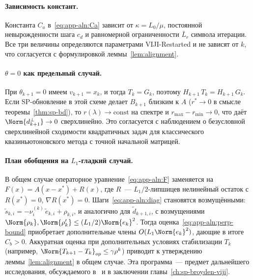 \paragraph{Зависимость констант.} Константа $C_a$ в~\eqref{eq:app-aln:Ca}
зависит от $\kappa = L_0/\mu$, постоянной невырожденности шага $c_d$
и равномерной ограниченности $\bar L_r$ символа итерации. Все три
величины определяются параметрами VIJI-Restarted и не зависят от
$k$, что согласуется с формулировкой леммы~\ref{lem:alignment}.

\paragraph{$\theta = 0$ как предельный случай.}
При $\theta_{k+1} = 0$ имеем $v_{k+1} = x_k$, и тогда
$T_k = G_k$, поэтому $H_{k+1}\,T_k = H_{k+1}\,G_k$. Если SP-обновление в
этой схеме делает $B_{k+1}$ близким к $A$ ($r^{*} \to 0$ в смысле
теоремы~\ref{thm:sp-bd}), то $r(\lambda) \to \mathrm{const}$ на спектре
и $r_{\max} - r_{\min} \to 0$, что даёт $\Norm{d_{k+1}^{\perp}} \to 0$
сверхлинейно. Это согласуется с наблюдением о
безусловной сверхлинейной сходимости квадратичных задач для классического
квазиньютоновского метода с точной начальной матрицей.

\paragraph{План обобщения на $L_1$-гладкий случай.}
В общем случае операторное уравнение~\eqref{eq:app-aln:F} заменяется на
$F(x) = A(x - x^{*}) + R(x)$, где $R$~--- $L_1/2$-липшицев нелинейный остаток
с $R(x^{*}) = 0$, $\nabla R(x^{*}) = 0$. Шаги~\eqref{eq:app-aln:diag}
становятся возмущёнными:
$\tilde s_{k,i} = -\nu_i^{(k)}\,\tilde e_{k,i} + \rho_{k,i}$, и аналогично
для $\tilde d_{k+1,i}$, с возмущениями $\Norm{\rho_k}, \Norm{\rho'_k} \le (L_1/2)\Norm{e_k}^{2}$.
Тогда оценка~\eqref{eq:app-aln:perp-bound} приобретает дополнительные
члены $O(L_1\Norm{e_k}^{2})$, дающие в итоге $C_b > 0$. Аккуратная оценка
при дополнительных условиях стабилизации $T_k$ (например,
$\Norm{T_{k+1} - T_k}_{op} \le \gamma \rho^{k}$) приводит к утверждению
леммы~\ref{lem:alignment} в общем случае. Эта программа~--- предмет
дальнейшего исследования, обсуждаемого в~\cite{Agafonov2024VIJI} и в
заключении главы~\ref{ch:sp-broyden-viji}.
